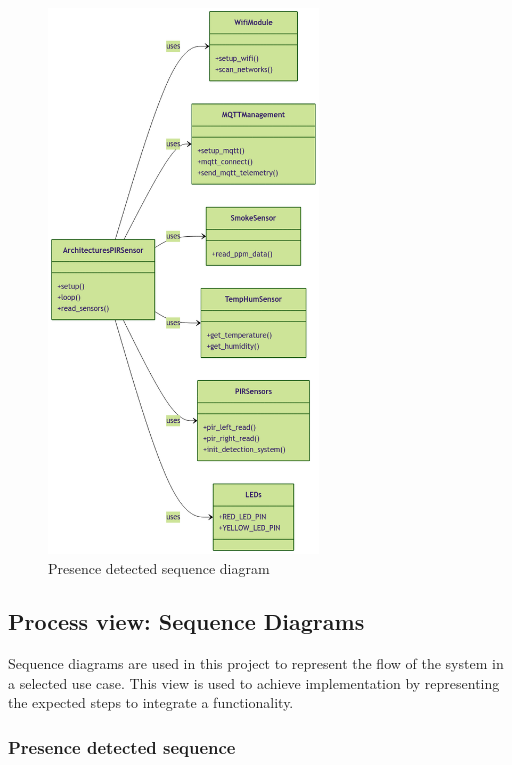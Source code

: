 \begin{figure}[H]
    \centering
    \includegraphics[width=0.64\textwidth]{./images/6/ClassPIRSensor.png}
    \caption{Presence detected sequence diagram}
\end{figure}

\subsection{Process view: Sequence Diagrams}

Sequence diagrams are used in this project to represent the flow of the system in a selected use case. This view is used 
to achieve implementation by representing the expected steps to integrate a functionality.

\subsubsection*{Presence detected sequence}

